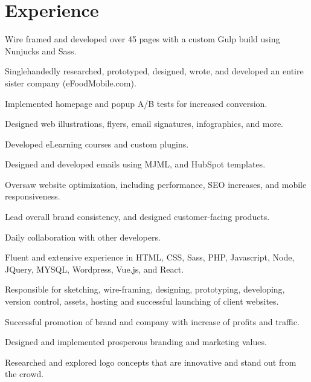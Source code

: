 \documentclass[]{deedy-resume-openfont}
\begin{document}
\begin{minipage}[t]{0.66\textwidth} 


\section{Experience}
\vspace{\topsep} %
\begin{tightemize}
\item Wire framed and developed over 45 pages with a custom Gulp build using Nunjucks and Sass.
\item Singlehandedly researched, prototyped, designed, wrote, and developed an entire sister company (eFoodMobile.com).
\item Implemented homepage and popup A/B tests for increased conversion.
\item Designed web illustrations, flyers, email signatures, infographics, and more.
\item Developed eLearning courses and custom plugins.
\item Designed and developed emails using MJML, and HubSpot templates.
\item Oversaw website optimization, including performance, SEO increases, and mobile responsiveness.
\item Lead overall brand consistency, and designed customer-facing products.
\item Daily collaboration with other developers.
\end{tightemize}
\sectionsep


\begin{tightemize}
\item Fluent and extensive experience in HTML, CSS, Sass, PHP, Javascript, Node, JQuery, MYSQL, Wordpress, Vue.js, and React.
\item Responsible for sketching, wire-framing, designing, prototyping, developing, version control, assets, hosting and successful launching of client websites.
\item Successful promotion of brand and company with increase of profits and traffic.
\item Designed and implemented prosperous branding and marketing values.
\item Researched and explored logo concepts that are innovative and stand out from the crowd.
\end{tightemize}
\sectionsep


\end{minipage}
\end{document}
